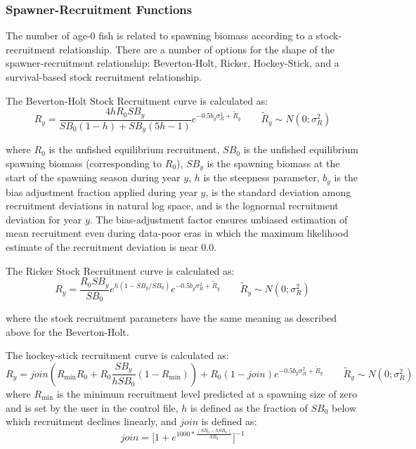 \subsubsection{Spawner-Recruitment Functions}
The number of age-0 fish is related to spawning biomass according to a stock-recruitment relationship.  There are a number of options for the shape of the spawner-recruitment relationship: Beverton-Holt, Ricker, Hockey-Stick, and a survival-based stock recruitment relationship.

\hypertarget{BH}{}
The Beverton-Holt Stock Recruitment curve is calculated as:
\begin{equation}{R_y = \frac{4hR_0SB_y}{SB_0(1-h)+SB_y(5h-1)}e^{-0.5b_y\sigma^2_R+\tilde{R}_y}\qquad  \tilde{R}_y\sim N(0;\sigma^2_R)}
\end{equation}

where $R_0$ is the unfished equilibrium recruitment, $SB_0$ is the unfished equilibrium spawning biomass (corresponding to $R_0$), $SB_y$ is the spawning biomass at the start of the spawning season during year $y$, $h$ is the steepness parameter, $b_y$ is the bias adjustment fraction applied during year $y$, is the standard deviation among recruitment deviations in natural log space, and is the lognormal recruitment deviation for year $y$. The bias-adjustment factor \citep{methot-adjusting-2011} ensures unbiased estimation of mean recruitment even during data-poor eras in which the maximum likelihood estimate of the recruitment deviation is near 0.0.

\hypertarget{Ricker}{}
The Ricker Stock Recruitment curve is calculated as:
\begin{equation}{R_y = \frac{R_0SB_y}{SB_0}e^{h(1-SB_y/SB_0)}e^{-0.5b_y\sigma^2_R+\tilde{R}_y}\qquad  \tilde{R}_y\sim N(0;\sigma^2_R)}
\end{equation}

where the stock recruitment parameters have the same meaning as described above for the Beverton-Holt.

\hypertarget{Hockey}{}
The hockey-stick recruitment curve is calculated as:
\begin{equation}{R_y = join(R_{\text{min}}R_0+R_0\frac{SB_y}{hSB_0}(1-R_{\text{min}}))+R_0(1-join)e^{-0.5b_y\sigma^2_R+\tilde{R}_y}\qquad  \tilde{R}_y\sim N(0;\sigma^2_R)}\end{equation}
where $R_{\text{min}}$ is the minimum recruitment level predicted at a spawning size of zero and is set by the user in the control file, $h$ is defined as the fraction of $SB_0$ below which recruitment declines linearly, and $join$ is defined as:
\begin{equation}{ join = \bigg[1+e^{1000*\frac{(SB_0-hSB_0)}{SB_0}}\bigg]^{-1} } \end{equation}

